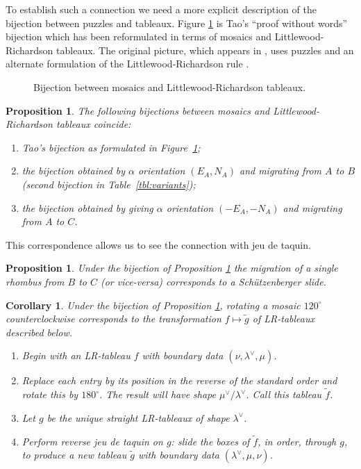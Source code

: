 \documentclass[12pt]{article}
\newtheorem{proposition}[lemma]{Proposition}
\newtheorem{corollary}[lemma]{Corollary}
\begin{document}
To establish such a connection we need a more explicit description
of the bijection between puzzles and tableaux.  Figure \ref{fig:tao}
is Tao's ``proof without words'' bijection which has been reformulated
in terms of mosaics and Littlewood-Richardson tableaux.  The original
picture, which appears in \cite{vakil}, uses puzzles and an alternate
formulation of the Littlewood-Richardson 
rule \cite[Cor. 5.1.2]{fulton:tableaux}.

\begin{figure}[htbp]
\begin{center}
\caption{Bijection between mosaics and Littlewood-Richardson tableaux.}
\label{fig:tao}
\end{center}
\end{figure}


\begin{proposition}
\label{prop:samebijection}
The following bijections between mosaics and Littlewood-Richardson
tableaux coincide:
\begin{enumerate}
\item[(i)] Tao's bijection as formulated in Figure~\ref{fig:tao};
\item[(ii)] the bijection obtained by $\alpha$ orientation 
$(E_A, N_A)$ and migrating from $A$ to $B$ (second bijection in 
Table~\ref{tbl:variants});
\item[(iii)] the bijection obtained by giving $\alpha$ orientation 
$(-E_A, -N_A)$ and migrating from $A$ to $C$.
\end{enumerate}
\end{proposition}

This correspondence allows us to see the connection with jeu de taquin.

\begin{proposition}
\label{prop:slides}
Under the bijection of Proposition \ref{prop:samebijection} the migration
of a single rhombus from $B$ to $C$ (or vice-versa) corresponds to
a Sch\"utzenberger slide.
\end{proposition} 

\begin{corollary}
\label{cor:rotate}
Under the bijection of Proposition \ref{prop:samebijection},
rotating a mosaic $120^\circ$ counterclockwise corresponds to the
transformation $f \mapsto \tilde g$ of LR-tableaux described below.
\begin{enumerate}
\item Begin with an LR-tableau $f$ with boundary data $(\nu, \lambda^\vee, \mu)$.
\item Replace each entry by its position in the reverse of the
standard order and rotate this by $180^\circ$.  The result will have
shape $\mu^\vee/\lambda^\vee$.  Call this tableau $\tilde f$.
\item Let $g$ be the unique straight LR-tableaux of shape $\lambda^\vee$.
\item Perform reverse jeu de taquin on $g$: slide the boxes of $\tilde f$, in 
order, through $g$, to produce a new tableau $\tilde g$ with boundary data 
$(\lambda^\vee, \mu, \nu)$.
\end{enumerate}
\end{corollary}
\end{document}
